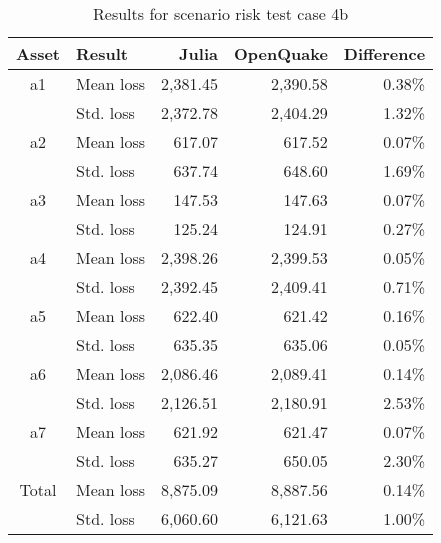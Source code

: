 \begin{table}[htbp]

\centering
\begin{tabular}{ c l r r r }

\hline
\rowcolor{anti-flashwhite}
\bf{Asset} & \bf{Result} & \bf{Julia} & \bf{OpenQuake} & \bf{Difference}\\
\hline
a1 & Mean loss & 2,381.45 & 2,390.58 & 0.38\% \\
 & Std. loss & 2,372.78 & 2,404.29 & 1.32\% \\
\hline
a2 & Mean loss & 617.07 & 617.52 & 0.07\% \\
 & Std. loss & 637.74 & 648.60 & 1.69\% \\
\hline
a3 & Mean loss & 147.53 & 147.63 & 0.07\% \\
 & Std. loss & 125.24 & 124.91 & 0.27\% \\
\hline
a4 & Mean loss & 2,398.26 & 2,399.53 & 0.05\% \\
 & Std. loss & 2,392.45 & 2,409.41 & 0.71\% \\
\hline
a5 & Mean loss & 622.40 & 621.42 & 0.16\% \\
 & Std. loss & 635.35 & 635.06 & 0.05\% \\
\hline
a6 & Mean loss & 2,086.46 & 2,089.41 & 0.14\% \\
 & Std. loss & 2,126.51 & 2,180.91 & 2.53\% \\
\hline
a7 & Mean loss & 621.92 & 621.47 & 0.07\% \\
 & Std. loss & 635.27 & 650.05 & 2.30\% \\
\hline
Total & Mean loss & 8,875.09 & 8,887.56 & 0.14\% \\
 & Std. loss & 6,060.60 & 6,121.63 & 1.00\% \\
\hline
\end{tabular}

\caption{Results for scenario risk test case 4b}
\label{tab:result-sr-4b}
\end{table}
